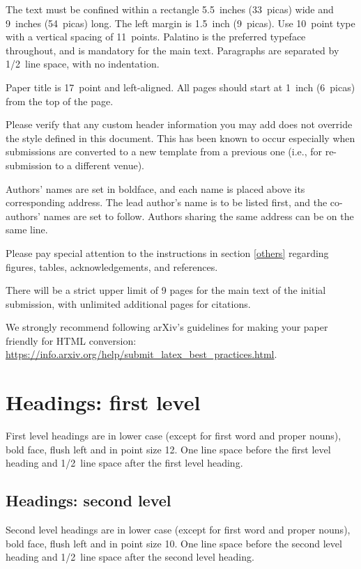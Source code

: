 \documentclass{article} %
\begin{document}
The text must be confined within a rectangle 5.5~inches (33~picas) wide and
9~inches (54~picas) long. The left margin is 1.5~inch (9~picas).
Use 10~point type with a vertical spacing of 11~points. Palatino is the
preferred typeface throughout, and is mandatory for the main text. Paragraphs are separated by 1/2~line space, with no indentation. 

Paper title is 17~point and left-aligned.
All pages should start at 1~inch (6~picas) from the top of the page.

Please verify that any custom header information you may add does not override the style defined in this document. This has been known to occur especially when submissions are converted to a new template from a previous one (i.e., for re-submission to a different venue). 

Authors' names are
set in boldface, and each name is placed above its corresponding
address. The lead author's name is to be listed first, and
the co-authors' names are set to follow. Authors sharing the
same address can be on the same line.

Please pay special attention to the instructions in section \ref{others}
regarding figures, tables, acknowledgements, and references.


There will be a strict upper limit of 9 pages for the main text of the initial submission, with unlimited additional pages for citations. 

We strongly recommend following arXiv's guidelines for making your paper friendly for HTML conversion: \url{https://info.arxiv.org/help/submit_latex_best_practices.html}.


\section{Headings: first level}
\label{headings}

First level headings are in lower case (except for first word and proper nouns), bold face,
flush left and in point size 12. One line space before the first level
heading and 1/2~line space after the first level heading.

\subsection{Headings: second level}

Second level headings are in lower case (except for first word and proper nouns), bold face,
flush left and in point size 10. One line space before the second level
heading and 1/2~line space after the second level heading.
\end{document}
